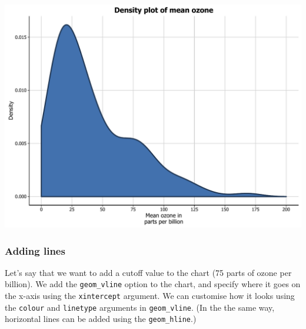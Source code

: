 \documentclass[]{article}
\newenvironment{Shaded}{\begin{snugshade}}{\end{snugshade}}
\newcommand{\KeywordTok}[1]{\textcolor[rgb]{0.13,0.29,0.53}{\textbf{{#1}}}}
\newcommand{\DataTypeTok}[1]{\textcolor[rgb]{0.13,0.29,0.53}{{#1}}}
\newcommand{\DecValTok}[1]{\textcolor[rgb]{0.00,0.00,0.81}{{#1}}}
\newcommand{\StringTok}[1]{\textcolor[rgb]{0.31,0.60,0.02}{{#1}}}
\newcommand{\NormalTok}[1]{{#1}}
\begin{document}
\begin{center}\includegraphics{0_all_posts_pdf/density_12-1} \end{center}

\subsubsection{Adding lines}\label{adding-lines-1}

Let's say that we want to add a cutoff value to the chart (75 parts of
ozone per billion). We add the \texttt{geom\_vline} option to the chart,
and specify where it goes on the x-axis using the \texttt{xintercept}
argument. We can customise how it looks using the \texttt{colour} and
\texttt{linetype} arguments in \texttt{geom\_vline}. (In the the same
way, horizontal lines can be added using the \texttt{geom\_hline}.)

\begin{Shaded}
\end{Shaded}
\end{document}
